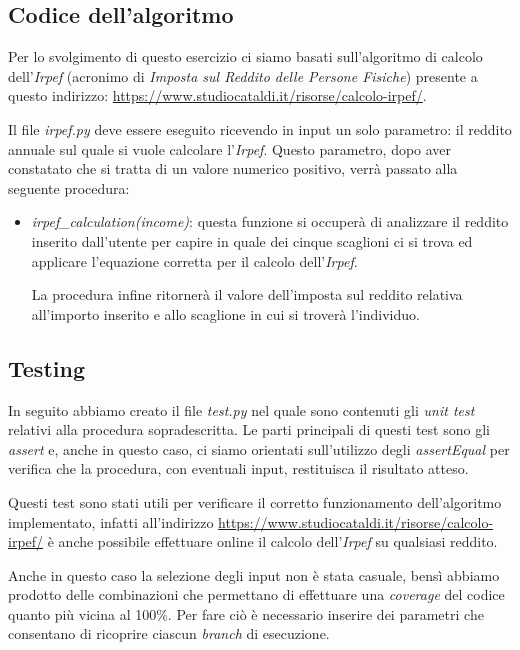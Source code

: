 \documentclass[a4paper, 12pt]{article}
\begin{document}
	\subsection*{Codice dell'algoritmo}
	Per lo svolgimento di questo esercizio ci siamo basati sull'algoritmo di calcolo dell'\textit{Irpef} (acronimo di \textit{Imposta sul Reddito delle Persone Fisiche}) presente a questo indirizzo: \url{https://www.studiocataldi.it/risorse/calcolo-irpef/}.
	
	Il file \textit{irpef.py} deve essere eseguito ricevendo in input un solo parametro: il reddito annuale sul quale si vuole calcolare l'\textit{Irpef}. Questo parametro, dopo aver constatato che si tratta di un valore numerico positivo, verrà passato alla seguente procedura:
	\begin{itemize}
		\item \textit{irpef\_calculation(income)}: questa funzione si occuperà di analizzare il reddito inserito dall'utente per capire in quale dei cinque scaglioni ci si trova ed applicare l'equazione corretta per il calcolo dell'\textit{Irpef}.
		
		La procedura infine ritornerà il valore dell'imposta sul reddito relativa all'importo inserito e allo scaglione in cui si troverà l'individuo.
	\end{itemize}
	
	\subsection*{Testing}
	In seguito abbiamo creato il file \textit{test.py} nel quale sono contenuti gli \textit{unit test} relativi alla procedura sopradescritta. Le parti principali di questi test sono gli \textit{assert} e, anche in questo caso, ci siamo orientati sull'utilizzo degli \textit{assertEqual} per verifica che la procedura, con eventuali input, restituisca il risultato atteso.
	
	Questi test sono stati utili per verificare il corretto funzionamento dell'algoritmo implementato, infatti all'indirizzo \url{https://www.studiocataldi.it/risorse/calcolo-irpef/} è anche possibile effettuare online il calcolo dell'\textit{Irpef} su qualsiasi reddito.
	
	Anche in questo caso la selezione degli input non è stata casuale, bensì abbiamo prodotto delle combinazioni che permettano di effettuare una \textit{coverage} del codice quanto più vicina al 100\%. Per fare ciò è necessario inserire dei parametri che consentano di ricoprire ciascun \textit{branch} di esecuzione.
	
\end{document}
